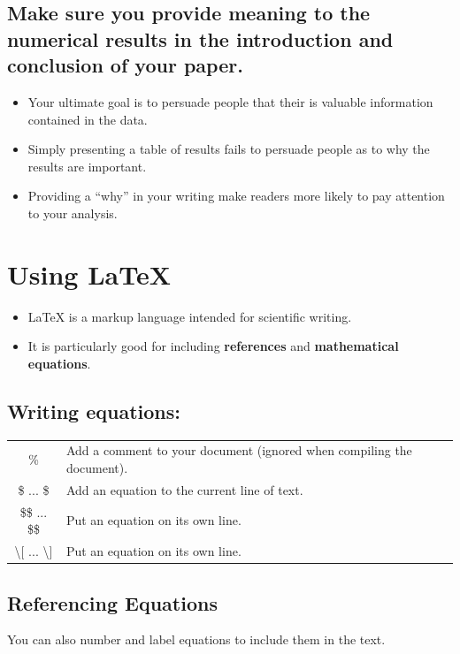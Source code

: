 \documentclass[12pt]{notes}
\begin{document}
\subsection*{Make sure you provide meaning to the numerical results in the introduction and conclusion of your paper.}
\begin{itemize}
\item Your ultimate goal is to persuade people that their is valuable information contained in the data. 
\item Simply presenting a table of results fails to persuade people as to why the results are important. 
\item Providing a ``why'' in your writing make readers more likely to pay attention to your analysis. 
\end{itemize}

\section{Using LaTeX}
\begin{itemize}
\item LaTeX is a markup language intended for scientific writing. 
\item It is particularly good for including \textbf{references} and \textbf{mathematical equations}. 
\end{itemize}

\subsection*{Writing equations:}

\begin{tabular}{cl}
\% & Add a comment to your document (ignored when compiling the document).  \\
\$ ... \$ & Add an equation to the current line of text. \\
\$\$ ... \$\$ & Put an equation on its own line. \\
\textbackslash[ ... \textbackslash] & Put an equation on its own line.  \\
\end{tabular}

\subsection*{Referencing Equations}
You can also number and label equations to include them in the text. 
\end{document}
